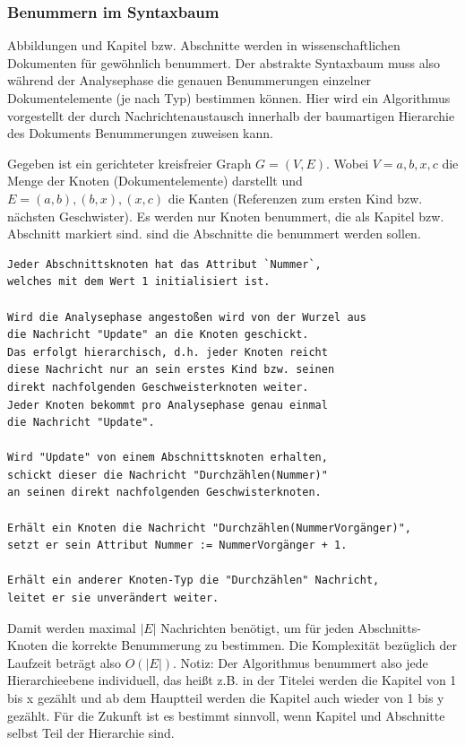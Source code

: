  
\subsubsection{Benummern im Syntaxbaum}\label{}

 
Abbildungen und Kapitel bzw. Abschnitte werden in wissenschaftlichen Dokumenten für gewöhnlich benummert. Der abstrakte Syntaxbaum muss also während der Analysephase die genauen Benummerungen einzelner Dokumentelemente (je nach Typ) bestimmen können. Hier wird ein Algorithmus vorgestellt der durch Nachrichtenaustausch innerhalb der baumartigen Hierarchie des Dokuments Benummerungen zuweisen kann.

 
Gegeben ist ein gerichteter kreisfreier Graph \(G = (V, E)\). Wobei \(V = { a, b, x, c }\) die Menge der Knoten (Dokumentelemente) darstellt und \(E = { (a,b), (b,x), (x,c) }\) die Kanten (Referenzen zum ersten Kind bzw. nächsten Geschwister). Es werden nur Knoten benummert, die als Kapitel bzw. Abschnitt markiert sind. sind die Abschnitte die benummert werden sollen.

 
\begin{verbatim}
Jeder Abschnittsknoten hat das Attribut `Nummer`,
welches mit dem Wert 1 initialisiert ist.

Wird die Analysephase angestoßen wird von der Wurzel aus
die Nachricht "Update" an die Knoten geschickt.
Das erfolgt hierarchisch, d.h. jeder Knoten reicht
diese Nachricht nur an sein erstes Kind bzw. seinen
direkt nachfolgenden Geschweisterknoten weiter.
Jeder Knoten bekommt pro Analysephase genau einmal
die Nachricht "Update".

Wird "Update" von einem Abschnittsknoten erhalten,
schickt dieser die Nachricht "Durchzählen(Nummer)"
an seinen direkt nachfolgenden Geschwisterknoten.

Erhält ein Knoten die Nachricht "Durchzählen(NummerVorgänger)",
setzt er sein Attribut Nummer := NummerVorgänger + 1.

Erhält ein anderer Knoten-Typ die "Durchzählen" Nachricht,
leitet er sie unverändert weiter.
\end{verbatim}
 
Damit werden maximal \(|E|\) Nachrichten benötigt, um für jeden Abschnitts-Knoten die korrekte Benummerung zu bestimmen. Die Komplexität bezüglich der Laufzeit beträgt also \(O(|E|)\). Notiz: Der Algorithmus benummert also jede Hierarchieebene individuell, das heißt z.B. in der Titelei werden die Kapitel von 1 bis x gezählt und ab dem Hauptteil werden die Kapitel auch wieder von 1 bis y gezählt. Für die Zukunft ist es bestimmt sinnvoll, wenn Kapitel und Abschnitte selbst Teil der Hierarchie sind.

